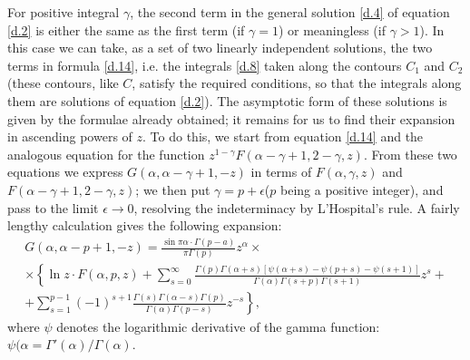 For positive integral $\gamma$, the second term in the general solution \eqref{d.4} of equation \eqref{d.2} is either the same as the first term (if $ \gamma = 1 $) or meaningless (if $ \gamma > 1 $). In this case we can take, as a set of two linearly independent solutions, the two terms in formula \eqref{d.14}, i.e. the integrals \eqref{d.8} taken along the contours $ C_1 $ and $ C_2 $ (these contours, like $ C $, satisfy the required conditions, so that the integrals along them are solutions of equation \eqref{d.2}). The asymptotic form of these solutions is given by the formulae already obtained; it remains for us to find their expansion in ascending powers of $ z $. To do this, we start from equation \eqref{d.14} and the analogous equation for the function $ z^{1-\gamma} F (\alpha-\gamma + 1, 2 -\gamma, z) $. From these two equations we express $ G (\alpha, \alpha-\gamma  + 1, - z) $ in terms of $ F (\alpha, \gamma, z) $ and $ F (\alpha-\gamma  + 1, 2 -\gamma, z) $; we then put $ \gamma= p + \epsilon  $($ p $ being a positive integer), and pass to the limit $ \epsilon\to0 $, resolving the indeterminacy by L’Hospital’s rule. A fairly lengthy calculation gives the following expansion:
\begin{multline}\label{d.17}
G(\alpha,\alpha-p+1,-z)=\frac{\sin\pi\alpha\cdot\Gamma(p-a)}{\pi\Gamma(p)}z^\alpha\times\\
\times\left\{\ln z\cdot F(\alpha,p,z)
+\sum_{s=0}^\infty\frac{\Gamma(p)\Gamma(\alpha+s)\left[\psi(\alpha+s)-\psi(p+s)-\psi(s+1) \right]}{\Gamma(\alpha)\Gamma(s+p)\Gamma(s+1)}z^s+\right.\\
\left.+\sum_{s=1}^{p-1}(-1)^{s+1}\frac{\Gamma(s)\Gamma(\alpha-s)\Gamma(p)}{\Gamma(\alpha)\Gamma(p-s)}z^{-s}    \right\},
\end{multline}
where $\psi$ denotes the logarithmic derivative of the gamma function: $ \psi(\alpha = \Gamma'(\alpha)/\Gamma(\alpha) $.
